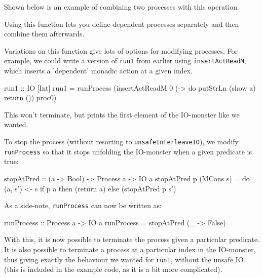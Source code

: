 Shown below is an example of combining two processes with this operation.


Using this function lets you define dependent processes separately and then combine them afterwards. 

Variations on this function give lots of options for modifying processes. For example, we could write a version of \verb+run1+ from earlier using \verb+insertActReadM+, which inserts a 'dependent' monadic action at a given index.

\begin{haskell}
run1 :: IO [Int]
run1 = runProcess (insertActReadM 0 (\a -> 
	do putStrLn (show a)
	   return ()) proc0)
\end{haskell}

This won't terminate, but prints the first element of the IO-monster like we wanted. 

To stop the process (without resorting to \verb+unsafeInterleaveIO+), we modify \verb+runProcess+ so that it stops unfolding the IO-monster when a given predicate is true:

\begin{haskell}
stopAtPred :: (a -> Bool) -> Process a -> IO a
stopAtPred p (MCons s) = do (a, s') <- s
                            if p a then (return a) else (stopAtPred p s')
\end{haskell}
 
As a side-note, \verb+runProcess+ can now be written as:
 
 \begin{haskell}
runProcess :: Process a -> IO a
runProcess = stopAtPred (\_ -> False)
\end{haskell}

With this, it is now possible to terminate the process given a particular predicate. It is also possible to terminate a process at a particular index in the IO-monster, thus giving exactly the behaviour we wanted for \verb+run1+, without the unsafe IO (this is included in the example code, as it is a bit more complicated). \\

